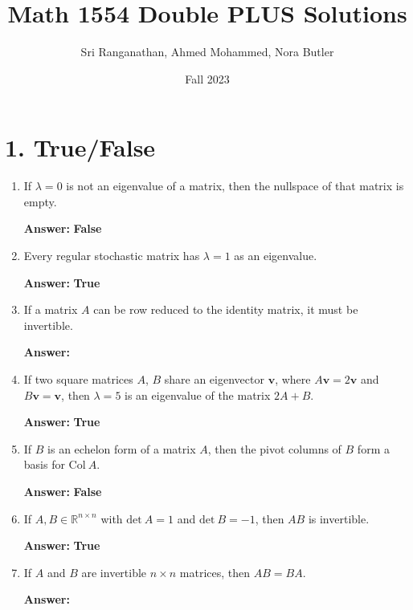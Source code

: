 \documentclass{article}
\begin{document}
\title{Math 1554 Double PLUS Solutions}
\author{Sri Ranganathan, Ahmed Mohammed, Nora Butler}
\date{Fall 2023}
\maketitle

\section*{1. True/False}

\begin{enumerate}[label= 1.\arabic*,left=0pt]
    \item If $\lambda = 0$ is not an eigenvalue of a matrix, then the nullspace of that matrix is empty.
    
    \textbf{Answer:} \textbf{False}
    
    \item Every regular stochastic matrix has $\lambda = 1$ as an eigenvalue.
    
    \textbf{Answer:} \textbf{True}
    
    \item If a matrix $A$ can be row reduced to the identity matrix, it must be invertible.
    
    \textbf{Answer:} \underline{\hspace{1cm}}
    
    \item If two square matrices $A$, $B$ share an eigenvector $\bm{v}$, where $A\bm{v} = 2\bm{v}$ and $B\bm{v} = \bm{v}$, then $\lambda = 5$ is an eigenvalue of the matrix $2A + B$.
    
    \textbf{Answer:} \textbf{True}
    
    \item If $B$ is an echelon form of a matrix $A$, then the pivot columns of $B$ form a basis for $\text{Col}~A$.
    
    \textbf{Answer:} \textbf{False}
    
    \item If $A, B \in \mathbb{R}^{n\times n}$ with $\text{det}~A = 1$ and $\text{det}~B = -1$, then $AB$ is invertible.
    
    \textbf{Answer:} \textbf{True}
    
    \item If $A$ and $B$ are invertible $n \times n$ matrices, then $AB = BA$.
    
    \textbf{Answer:} \underline{\hspace{1cm}}
    

\end{enumerate}
\end{document}
